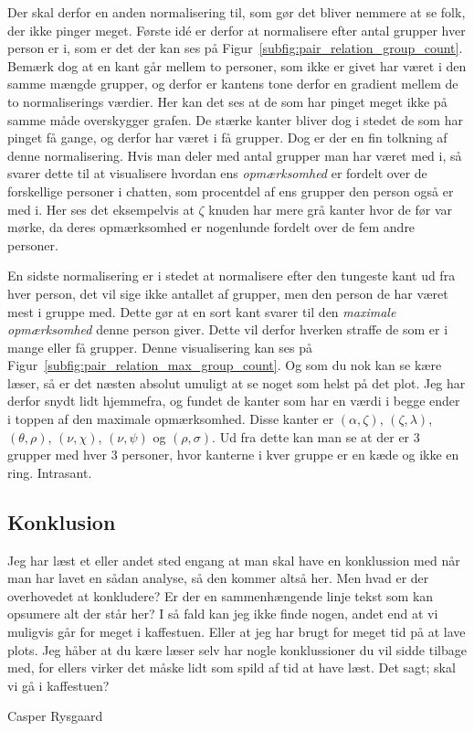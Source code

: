 \begin{article}
Der skal derfor en anden normalisering til, som gør det bliver nemmere at se folk, der ikke pinger meget. Første idé er derfor at normalisere efter antal grupper hver person er i, som er det der kan ses på Figur~\ref{subfig:pair_relation_group_count}. Bemærk dog at en kant går mellem to personer, som ikke er givet har været i den samme mængde grupper, og derfor er kantens tone derfor en gradient mellem de to normaliserings værdier. Her kan det ses at de som har pinget meget ikke på samme måde overskygger grafen. De stærke kanter bliver dog i stedet de som har pinget få gange, og derfor har været i få grupper. Dog er der en fin tolkning af denne normalisering. Hvis man deler med antal grupper man har været med i, så svarer dette til at visualisere hvordan ens \emph{opmærksomhed} er fordelt over de forskellige personer i chatten, som procentdel af ens grupper den person også er med i. Her ses det eksempelvis at $\zeta$ knuden har mere grå kanter hvor de før var mørke, da deres opmærksomhed er nogenlunde fordelt over de fem andre personer.

En sidste normalisering er i stedet at normalisere efter den tungeste kant ud fra hver person, det vil sige ikke antallet af grupper, men den person de har været mest i gruppe med. Dette gør at en sort kant svarer til den \emph{maximale opmærksomhed} denne person giver. Dette vil derfor hverken straffe de som er i mange eller få grupper. Denne visualisering kan ses på Figur~\ref{subfig:pair_relation_max_group_count}. Og som du nok kan se kære læser, så er det næsten absolut umuligt at se noget som helst på det plot. Jeg har derfor snydt lidt hjemmefra, og fundet de kanter som har en værdi i begge ender i toppen af den maximale opmærksomhed. Disse kanter er $(\alpha, \zeta)$, $(\zeta, \lambda)$, $(\theta, \rho)$, $(\nu, \chi)$, $(\nu, \psi)$ og $(\rho, \sigma)$. Ud fra dette kan man se at der er 3 grupper med hver 3 personer, hvor kanterne i kver gruppe er en kæde og ikke en ring. Intrasant.


\subsection*{Konklusion}

Jeg har læst et eller andet sted engang at man skal have en konklussion med når man har lavet en sådan analyse, så den kommer altså her.
Men hvad er der overhovedet at konkludere? Er der en sammenhængende linje tekst som kan opsumere alt der står her?
I så fald kan jeg ikke finde nogen, andet end at vi muligvis går for meget i kaffestuen. Eller at jeg har brugt for meget tid på at lave plots.
Jeg håber at du kære læser selv har nogle konklussioner du vil sidde tilbage med, for ellers virker det måske lidt som spild af tid at have læst.
Det sagt; skal vi gå i kaffestuen? \coffee\


\end{article}

\begin{flushright}
Casper Rysgaard
\end{flushright}
